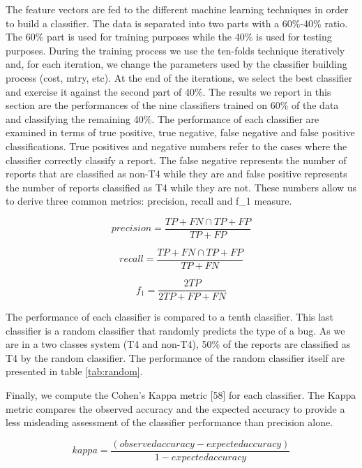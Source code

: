 \documentclass[12pt]{report}
\begin{document}
The feature vectors are fed to the different machine learning techniques
in order to build a classifier. The data is separated into two parts
with a 60\%-40\% ratio. The 60\% part is used for training purposes
while the 40\% is used for testing purposes. During the training process
we use the ten-folds technique iteratively and, for each iteration, we
change the parameters used by the classifier building process (cost,
mtry, etc). At the end of the iterations, we select the best classifier
and exercise it against the second part of 40\%. The results we report
in this section are the performances of the nine classifiers trained on
60\% of the data and classifying the remaining 40\%. The performance of
each classifier are examined in terms of true positive, true negative,
false negative and false positive classifications. True positives and
negative numbers refer to the cases where the classifier correctly
classify a report. The false negative represents the number of reports
that are classified as non-T4 while they are and false positive
represents the number of reports classified as T4 while they are not.
These numbers allow us to derive three common metrics: precision, recall
and f\_1 measure.

\begin{equation}
precision = \frac{TP+FN \cap TP+FP}{TP+FP}
\end{equation}

\begin{equation}
recall = \frac{TP+FN \cap TP+FP}{TP+FN}
\end{equation}

\begin{equation}
f_1 = \frac{2TP}{2TP + FP + FN}
\end{equation}

The performance of each classifier is compared to a tenth classifier.
This last classifier is a random classifier that randomly predicts the
type of a bug. As we are in a two classes system (T4 and non-T4), 50\%
of the reports are classified as T4 by the random classifier. The
performance of the random classifier itself are presented in table
\ref{tab:random}.

Finally, we compute the Cohen's Kappa metric {[}58{]} for each
classifier. The Kappa metric compares the observed accuracy and the
expected accuracy to provide a less misleading assessment of the
classifier performance than precision alone.

\begin{equation}
kappa = \frac{(observed accuracy - expected accuracy)}{1 - expected accuracy}
\end{equation}
\end{document}
